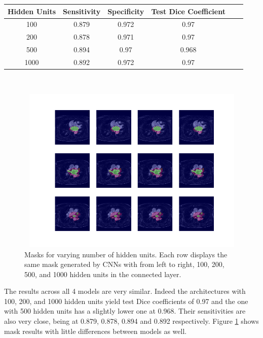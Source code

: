 {
\centering
\begin{tabular}{cccccc}
\rowcolor[HTML]{C0C0C0} 
                 Hidden Units & Sensitivity & Specificity & Test Dice Coefficient \\ \hline
100   & 0.879       & 0.972       & 0.97                                                         \\ 
200   & 0.878       & 0.971       & 0.97                                                         \\ 
500   & 0.894       & 0.97        & 0.968                                                        \\ 
1000  & 0.892       & 0.972       & 0.97                                                        
\end{tabular}\\
\vspace{0.5cm}
}

\begin{figure}
\centering
\includegraphics[trim=2.5cm 1.5cm 2cm 1.5cm, clip=true, height=80mm, width=150mm]{Chapter3/mask_results_varying_number_of_hidden_units.png}
\caption{Masks for varying number of hidden units. Each row displays the same mask generated by CNNs with from left to right, 100, 200, 500, and 1000 hidden units in the connected layer.}
\label{mask_varying_hidden_units}
\end{figure}

\noindent The results across all 4 models are very similar. Indeed the architectures with 100, 200, and 1000 hidden units yield test Dice coefficients of 0.97 and the one with 500 hidden units has a slightly lower one at 0.968. Their sensitivities are also very close, being at 0.879, 0.878, 0.894 and 0.892 respectively. Figure \ref{mask_varying_hidden_units} shows mask results with little differences between models as well. \\

